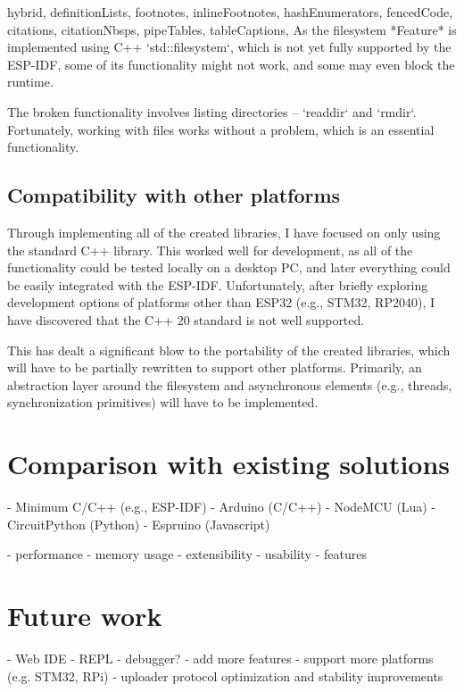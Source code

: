 \documentclass[
  digital,
  oneside,
  nosansbold,
  nocolorbold,
  lof,
  lot
]{fithesis4}
\begin{document}
\begin{markdown*}{%
  hybrid,
  definitionLists,
  footnotes,
  inlineFootnotes,
  hashEnumerators,
  fencedCode,
  citations,
  citationNbsps,
  pipeTables,
  tableCaptions,
}
As the filesystem *Feature* is implemented using C++ `std::filesystem`, which is not yet fully supported by the ESP-IDF, some of its functionality might not work, and some may even block the runtime.

The broken functionality involves listing directories -- `readdir` and `rmdir`. Fortunately, working with files works without a problem, which is an essential functionality.


\section{Compatibility with other platforms}

Through implementing all of the created libraries, I have focused on only using the standard C++ library. This worked well for development, as all of the functionality could be tested locally on a desktop PC, and later everything could be easily integrated with the ESP-IDF. Unfortunately, after briefly exploring development options of platforms other than ESP32 (e.g., STM32, RP2040), I have discovered that the C++ 20 standard is not well supported.

This has dealt a significant blow to the portability of the created libraries, which will have to be partially rewritten to support other platforms. Primarily, an abstraction layer around the filesystem and asynchronous elements (e.g., threads, synchronization primitives) will have to be implemented.


\chapter{Comparison with existing solutions}

  - Minimum C/C++ (e.g., ESP-IDF)
  - Arduino (C/C++)
  - NodeMCU (Lua)
  - CircuitPython (Python)
  - Espruino (Javascript)

  - performance
  - memory usage
  - extensibility
  - usability
  - features


\chapter{Future work}

  - Web IDE
  - REPL
  - debugger?
  - add more features
  - support more platforms (e.g. STM32, RPi)
  - uploader protocol optimization and stability improvements

\end{markdown*}
\end{document}
